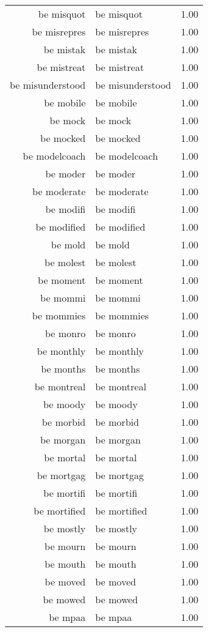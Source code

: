 \begin{table}[ht]
\begin{tabular}{rlr}
  be misquot & be misquot & 1.00 \\ 
  be misrepres & be misrepres & 1.00 \\ 
  be mistak & be mistak & 1.00 \\ 
  be mistreat & be mistreat & 1.00 \\ 
  be misunderstood & be misunderstood & 1.00 \\ 
  be mobile & be mobile & 1.00 \\ 
  be mock & be mock & 1.00 \\ 
  be mocked & be mocked & 1.00 \\ 
  be modelcoach & be modelcoach & 1.00 \\ 
  be moder & be moder & 1.00 \\ 
  be moderate & be moderate & 1.00 \\ 
  be modifi & be modifi & 1.00 \\ 
  be modified & be modified & 1.00 \\ 
  be mold & be mold & 1.00 \\ 
  be molest & be molest & 1.00 \\ 
  be moment & be moment & 1.00 \\ 
  be mommi & be mommi & 1.00 \\ 
  be mommies & be mommies & 1.00 \\ 
  be monro & be monro & 1.00 \\ 
  be monthly & be monthly & 1.00 \\ 
  be months & be months & 1.00 \\ 
  be montreal & be montreal & 1.00 \\ 
  be moody & be moody & 1.00 \\ 
  be morbid & be morbid & 1.00 \\ 
  be morgan & be morgan & 1.00 \\ 
  be mortal & be mortal & 1.00 \\ 
  be mortgag & be mortgag & 1.00 \\ 
  be mortifi & be mortifi & 1.00 \\ 
  be mortified & be mortified & 1.00 \\ 
  be mostly & be mostly & 1.00 \\ 
  be mourn & be mourn & 1.00 \\ 
  be mouth & be mouth & 1.00 \\ 
  be moved & be moved & 1.00 \\ 
  be mowed & be mowed & 1.00 \\ 
  be mpaa & be mpaa & 1.00 \\ 

\end{tabular}
\end{table}
